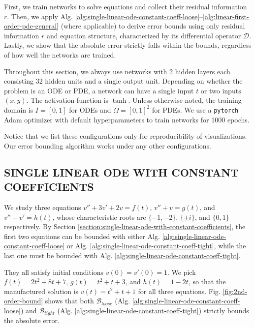 \documentclass[accepted]{uai2023}
\newcommand{\Bound}{\mathcal{B}}
\begin{document}
    First, we train networks to solve equations and collect their residual information $r$.
    Then, we apply Alg. \ref{alg:single-linear-ode-constant-coeff-loose}--\ref{alg:linear-first-order-pde-general} (where applicable) to derive error bounds using only residual information $r$ and equation structure, characterized by its differential operator $\mathcal {D}$. 
    Lastly, we show that the absolute error strictly falls within the bounds, regardless of how well the networks are trained.

    Throughout this section, we always use networks with 2 hidden layers each consisting 32 hidden units and a single output unit.
    Depending on whether the problem is an ODE or PDE, a network can have a single input $t$ or two inputs $(x, y)$.
    The activation function is $\tanh$. 
    Unless otherwise noted, the training domain is $I=[0, 1]$ for ODEs and $\Omega=[0,1]^2$ for PDEs. 
    We use a \texttt{pytorch} Adam optimizer with default hyperparameters to train networks for 1000 epochs.

    Notice that we list these configurations only for reproducibility of visualizations. 
    Our error bounding algorithm works under any other configurations.

\subsection{SINGLE LINEAR ODE WITH CONSTANT COEFFICIENTS}
    We study three equations $v'' + 3v' + 2v = f(t)$, $v'' + v = g(t)$, and $v'' - v' = h(t)$, whose characteristic roots are $\{-1, -2\}$, $\{\pm i\}$, and $\{0, 1\}$ respectively. 
    By Section \ref{section:single-linear-ode-with-constant-coefficients}, the first two equations can be bounded with either Alg. \ref{alg:single-linear-ode-constant-coeff-loose} or Alg. \ref{alg:single-linear-ode-constant-coeff-tight}, while the last one must be bounded with Alg. \ref{alg:single-linear-ode-constant-coeff-tight}.

    They all satisfy initial conditions $v(0) = v'(0) = 1$. 
    We pick $f(t) =2t^2+8t+7$, $g(t) = t^2+t+3$, and $h(t)=1-2t$, so that the manufactured solution is $v(t) = t^2 + t + 1$ for all three equations.
    Fig. \ref{fig:2nd-order-bound} shows that both $\Bound_{loose}$ (Alg. \ref{alg:single-linear-ode-constant-coeff-loose}) and $\Bound_{tight}$ (Alg. \ref{alg:single-linear-ode-constant-coeff-tight}) strictly bounds the absolute error.
    
\end{document}
